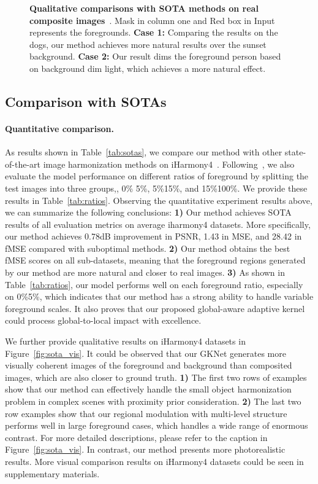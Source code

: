 \documentclass[10pt,twocolumn,letterpaper]{article}
\begin{document}
\begin{figure*}[t]
    \caption{{\bf Qualitative comparisons with SOTA methods on real composite images}~\cite{Tsai_2017_CVPR}. Mask in column one and Red box in Input represents the foregrounds. \textbf{Case 1:} Comparing the results on the dogs, our method achieves more natural results over the sunset background.  \textbf{Case 2:} Our result dims the foreground person based on background dim light, which achieves a more natural effect. }
    \label{fig:real_vis}
    \vspace{-1.0em}
\end{figure*}

\subsection{Comparison with SOTAs}

\paragraph{Quantitative comparison.}
As results shown in Table~\ref{tab:sotas}, we compare our method with other state-of-the-art image harmonization methods on iHarmony4~\cite{Cong_2020_CVPR}. Following~\cite{Cong_2020_CVPR,Sofiiuk_2021_WACV}, we also evaluate the model performance on different ratios of foreground by splitting the test images into three groups,\ie, {0\% 5\%}, {5\%15\%}, and {15\%100\%}. We provide these results in Table~\ref{tab:ratios}. Observing the quantitative experiment results above, we can summarize the following conclusions: {\bf 1)} Our method achieves SOTA results of all evaluation metrics on average iharmony4 datasets. More specifically, our method achieves 0.78dB improvement in PSNR, 1.43 in MSE, and 28.42 in fMSE compared with suboptimal methods. {\bf 2)} Our method obtains the best fMSE scores on all sub-datasets, meaning that the foreground regions generated by our method are more natural and closer to real images. {\bf 3)} As shown in Table~\ref{tab:ratios}, our model performs well on each foreground ratio, especially on {0\%5\%}, which indicates that our method has a strong ability to handle variable foreground scales. It also proves that our proposed global-aware adaptive kernel could process global-to-local impact with excellence.

We further provide qualitative results on iHarmony4 datasets in Figure~\ref{fig:sota_vis}. It could be observed that our GKNet generates more visually coherent images of the foreground and background than composited images, which are also closer to ground truth. 
{\bf 1)} The first two rows of examples show that our method can effectively handle the small object harmonization problem in complex scenes with proximity prior consideration.
{\bf 2)} The last two row examples show that our regional modulation with multi-level structure performs well in large foreground cases, which handles a wide range of enormous contrast. For more detailed descriptions, please refer to the caption in Figure~\ref{fig:sota_vis}.
In contrast, our method presents more photorealistic results. More visual comparison results on iHarmony4 datasets could be seen in supplementary materials.
\end{document}
